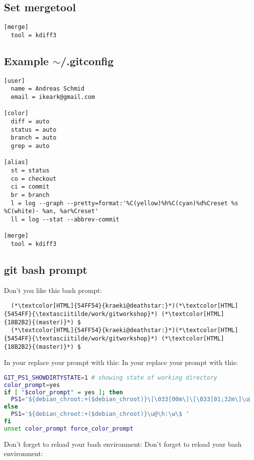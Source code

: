 \subsection{Set mergetool}
\begin{frame}[fragile]
  \subslidetitle
\begin{lstlisting}
[merge]
  tool = kdiff3
\end{lstlisting}
\end{frame}

\subsection{Example $\sim$/.gitconfig}
\begin{frame}[fragile]
  \subslidetitle

\begin{lstlisting}
[user]
  name = Andreas Schmid
  email = ikeark@gmail.com

[color]
  diff = auto
  status = auto
  branch = auto
  grep = auto

[alias]
  st = status
  co = checkout
  ci = commit
  br = branch
  l = log --graph --pretty=format:'%C(yellow)%h%C(cyan)%d%Creset %s %C(white)- %an, %ar%Creset'
  ll = log --stat --abbrev-commit

[merge]
  tool = kdiff3
\end{lstlisting}
\end{frame}
\subsection{git bash prompt}
\begin{frame}[fragile]
  \subslidetitle

  Don't you like this bash prompt:
  \begin{lstlisting}
  (*\textcolor[HTML]{54FF54}{kraeki@deathstar:}*)(*\textcolor[HTML]{5454FF}{\textasciitilde/work/gitworkshop}*) (*\textcolor[HTML]{18B2B2}{(master)}*) $
  (*\textcolor[HTML]{54FF54}{kraeki@deathstar:}*)(*\textcolor[HTML]{5454FF}{\textasciitilde/work/gitworkshop}*) (*\textcolor[HTML]{18B2B2}{(master)}*) $
  \end{lstlisting}

  In your  replace your prompt with this:
  In your  replace your prompt with this:
  \begin{lstlisting}[language=bash]
GIT_PS1_SHOWDIRTYSTATE=1 # showing state of working directory
color_prompt=yes
if [ "$color_prompt" = yes ]; then
  PS1='${debian_chroot:+($debian_chroot)}\[\033[00m\]\[\033[01;32m\]\u@\h\[\033[00m\]:\[\033[01;34m\]\w\[\033[00m\]\[\033[0;36m\]$(__git_ps1 " (%s)")\[\033[00m\] \$ '
else
  PS1='${debian_chroot:+($debian_chroot)}\u@\h:\w\$ '
fi
unset color_prompt force_color_prompt
\end{lstlisting}

  Don't forget to reload your bash environment: 
  Don't forget to reload your bash environment: 

\end{frame}
